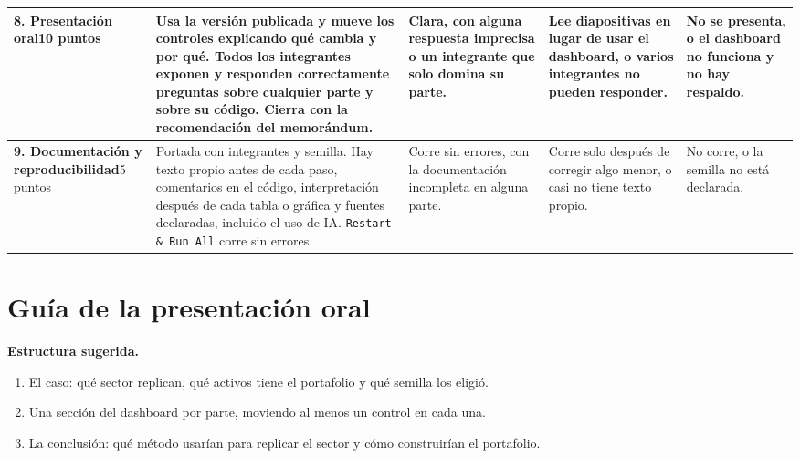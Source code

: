 \documentclass[10pt,letterpaper]{article}
\newcommand{\criterio}[2]{\textbf{#1}\newline\footnotesize #2 puntos}
\begin{document}
\begin{landscape}
\begin{longtable}{@{}L{3.1cm}L{5.0cm}L{5.0cm}L{4.4cm}L{4.0cm}@{}}
\criterio{8. Presentación oral}{10} &
Usa la versión publicada y mueve los controles explicando qué cambia y por qué. Todos los integrantes exponen y responden correctamente preguntas sobre cualquier parte y sobre su código. Cierra con la recomendación del memorándum. &
Clara, con alguna respuesta imprecisa o un integrante que solo domina su parte. &
Lee diapositivas en lugar de usar el dashboard, o varios integrantes no pueden responder. &
No se presenta, o el dashboard no funciona y no hay respaldo.\\
\midrule

\criterio{9. Documentación y reproducibilidad}{5} &
Portada con integrantes y semilla. Hay texto propio antes de cada paso, comentarios en el código, interpretación después de cada tabla o gráfica y fuentes declaradas, incluido el uso de IA. \texttt{Restart \& Run All} corre sin errores. &
Corre sin errores, con la documentación incompleta en alguna parte. &
Corre solo después de corregir algo menor, o casi no tiene texto propio. &
No corre, o la semilla no está declarada.\\
\end{longtable}
\normalsize
\end{landscape}

\section*{Guía de la presentación oral}

\textbf{Estructura sugerida.}
\begin{enumerate}[label=\arabic*.]
  \item El caso: qué sector replican, qué activos tiene el portafolio y qué semilla los eligió.
  \item Una sección del dashboard por parte, moviendo al menos un control en cada una.
  \item La conclusión: qué método usarían para replicar el sector y cómo construirían el portafolio.
\end{enumerate}
\end{document}
